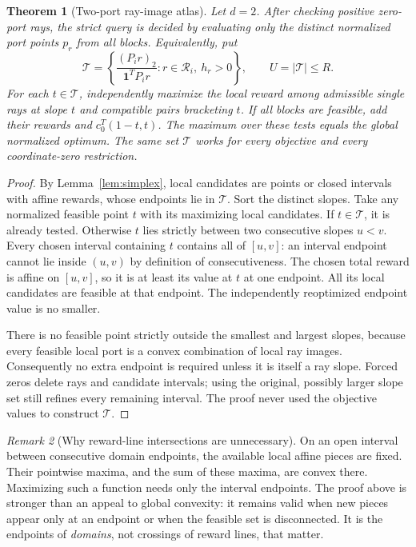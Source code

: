 \documentclass[11pt,a4paper]{article}
\newtheorem{theorem}{Theorem}[section]
\theoremstyle{definition}
\theoremstyle{remark}
\newtheorem{remark}[theorem]{Remark}
\newcommand{\one}{\mathbf1}\newcommand{\code}[1]{\texttt{\detokenize{#1}}}
\begin{document}
\begin{theorem}[Two-port ray-image atlas]
\label{thm:two}
Let $d=2$. After checking positive zero-port rays, the strict query is decided by evaluating only the distinct normalized port points $p_r$ from all blocks. Equivalently, put
\[
 \mathcal T=\left\{\frac{(P_i r)_2}{\one^TP_i r}:r\in\mathcal R_i,\ h_r>0\right\},\qquad U=|\mathcal T|\le R.
\]
For each $t\in\mathcal T$, independently maximize the local reward among admissible single rays at slope $t$ and compatible pairs bracketing $t$. If all blocks are feasible, add their rewards and $c_0^T(1-t,t)$. The maximum over these tests equals the global normalized optimum. The same set $\mathcal T$ works for every objective and every coordinate-zero restriction.
\end{theorem}
\begin{proof}
By Lemma~\ref{lem:simplex}, local candidates are points or closed intervals with affine rewards, whose endpoints lie in $\mathcal T$. Sort the distinct slopes. Take any normalized feasible point $t$ with its maximizing local candidates. If $t\in\mathcal T$, it is already tested. Otherwise $t$ lies strictly between two consecutive slopes $u<v$. Every chosen interval containing $t$ contains all of $[u,v]$: an interval endpoint cannot lie inside $(u,v)$ by definition of consecutiveness. The chosen total reward is affine on $[u,v]$, so it is at least its value at $t$ at one endpoint. All its local candidates are feasible at that endpoint. The independently reoptimized endpoint value is no smaller.

There is no feasible point strictly outside the smallest and largest slopes, because every feasible local port is a convex combination of local ray images. Consequently no extra endpoint is required unless it is itself a ray slope. Forced zeros delete rays and candidate intervals; using the original, possibly larger slope set still refines every remaining interval. The proof never used the objective values to construct $\mathcal T$.
\end{proof}

\begin{remark}[Why reward-line intersections are unnecessary]
On an open interval between consecutive domain endpoints, the available local affine pieces are fixed. Their pointwise maxima, and the sum of these maxima, are convex there. Maximizing such a function needs only the interval endpoints. The proof above is stronger than an appeal to global convexity: it remains valid when new pieces appear only at an endpoint or when the feasible set is disconnected. It is the endpoints of \emph{domains}, not crossings of reward lines, that matter.
\end{remark}
\end{document}
